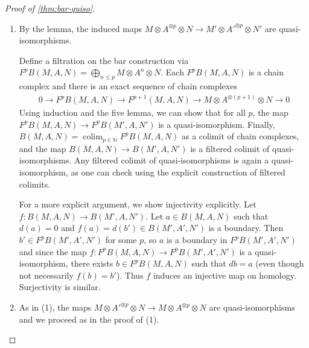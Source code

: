 \documentclass{scrartcl}
\theoremstyle{plain}
\newtheorem{theorem}{Theorem}[section]
\theoremstyle{definition}
\newcommand{\N}{\mathbb N}
\newcommand{\from}{\leftarrow}
\DeclareMathOperator{\colim}{colim}
\newcommand{\comp}{\mathbin{\circ}}
\begin{document}
\begin{proof}[Proof of \cref{thm:bar-quiso}]
    \begin{enumerate}
        \item By the lemma, the induced maps $M\otimes A^{\otimes p}\otimes N \to M'\otimes A'^{\otimes p}\otimes N'$ are quasi-isomorphisms. 

Define a filtration on the bar construction via $F^pB(M, A, N) = \bigoplus_{n\leq p} M\otimes A^n\otimes N$. Each $F^pB(M, A, N)$ is a chain complex and there is an exact sequence of chain complexes
\begin{align*}
    0\to F^pB(M, A, N)\to F^{p+1}(M, A, N) \to M\otimes A^{\otimes(p+1)}\otimes N \to 0
\end{align*}
Using induction and the five lemma, we can show that for all $p$, the map $F^pB(M, A, N)\to F^pB(M', A, N')$ is a quasi-isomorphism. Finally, $B(M, A, N)=\colim_{p\in \N} F^pB(M, A, N)$ as a colimit of chain complexes, and the map $B(M, A, N)\to B(M', A, N')$ is a filtered colimit of quasi-isomorphisms. Any filtered colimit of quasi-isomorphisms is again a quasi-isomorphism, as one can check using the explicit construction of filtered colimits. 

For a more explicit argument, we show injectivity explicitly. Let $f\colon B(M, A, N)\to B(M', A, N')$. Let $a\in B(M, A, N)$ such that $d(a) = 0$ and $f(a)=d(b')\in B(M', A', N')$ is a boundary. Then $b'\in F^pB(M', A', N')$ for some $p$, so $a$ is a boundary in $F^pB(M', A', N')$ and since the map $f\colon F^pB(M, A, N)\to F^pB(M', A', N')$ is a quasi-isomorphism, there exists $b\in F^pB(M, A, N)$ such that $db = a$ (even though not necessarily $f(b) = b'$). Thus $f$ induces an injective map on homology. Surjectivity is similar. 
\item As in (1), the maps $M\otimes A'^{\otimes p}\otimes N\to M\otimes A^{\otimes p}\otimes N$ are quasi-isomorphisms and we proceed as in the proof of (1). 
\end{enumerate}
\end{proof}


\end{document}
